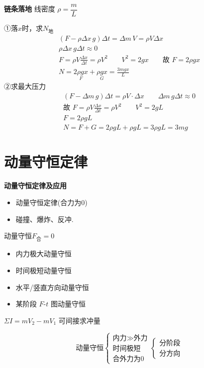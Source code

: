 \textbf{链条落地}
线密度 $\rho=\dfrac mL$

①落$x$时，求$N_{\text{地}}$
\begin{gather*}
(F-\rho\Delta x\,g)\Delta t=\Delta m\,V=\rho V\Delta x\\
\rho\Delta x\,g\Delta t\approx0\\
F=\rho V\frac{\Delta x}{\Delta t}=\rho V^2\qquad V^2=2gx\qquad\text{故 }F=2\rho gx\\
N=\underset{F}{2\rho gx}+\underset{G}{\rho gx}=\boxed{\frac{3mgx}{L}} %
\end{gather*}
②求最大压力
\begin{gather*}
(F-\Delta m\,g)\Delta t=\rho V\cdot\Delta x\qquad\Delta m\,g\Delta t\approx0\\
\text{故 }F=\rho V\frac{\Delta x}{\Delta t}=\rho V^2\qquad V^2=2gL\\
F=2\rho gL\\
N=F+G=2\rho gL+\rho gL=3\rho gL=\boxed{3mg} %
\end{gather*}


\section{动量守恒定律}
\textbf{动量守恒定律及应用}
\begin{itemize}
\item 动量守恒定律\quad (合力为0)
\item 碰撞、爆炸、反冲.
\end{itemize}

动量守恒\quad $F_{\text{合}}=0$
\begin{itemize}
\item 内力极大动量守恒
\item 时间极短动量守恒
\item 水平/竖直方向动量守恒
\item 某阶段 $F$-$t$ 图动量守恒
\end{itemize}
$\Sigma I=mV_2-mV_1$ 可间接求冲量

\[
\text{动量守恒}
\left\{
\begin{array}{l}
\text{内力}\gg\text{外力}\\
\text{时间极短}\\
\text{合外力为0}
\end{array}
\right.
\left\{
\begin{array}{l}
\text{分阶段}\\
\text{分方向}
\end{array}
\right.
\]

